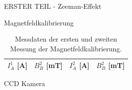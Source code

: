 \begin{appendix}
  \label{Anhang}
  
  
  
  \begin{chapter}{ERSTER TEIL - Zeeman-Effekt}
    \label{Anhang:chp:Zeeman}
    
    
    
    \begin{section}{Magnetfeldkalibrierung}
      \label{Anhang:chp:Zeemanmagnetfeld}
      
      \begin{table}[htbp]
        \centering
        \footnotesize
        \begin{tabular}{|c|c|c|c|}
          \hline
          $I_{A}^{1}$ [A] & $B_{B}^{2}$ [mT] & $I_{A}^{2}$ [A] & $B_{B}^{2}$ 
              [mT] \\ \hline
          
        \end{tabular}
        \caption{Messdaten der ersten und zweiten Messung der 
            Magnetfeldkalibrierung.}
        \label{tab:Magnetfeldkalibrierung}
      \end{table}
      
    \end{section}
    
    
    
    \begin{section}{CCD Kamera}
      \label{Anhang:chp:Zeemanccd}
      

\end{section}
\end{chapter}
\end{appendix}

